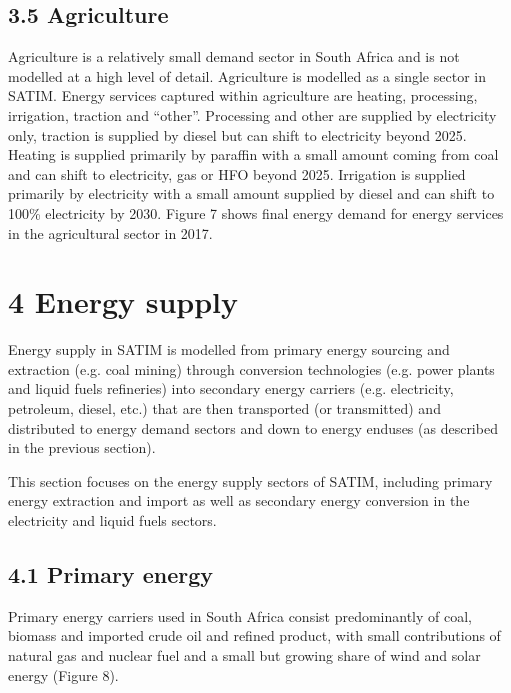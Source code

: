 \documentclass[letterpaper,10pt,english]{jupyterBook}
\begin{document}
\section{3.5 Agriculture}
\label{\detokenize{03Energydemand:agriculture}}
\sphinxAtStartPar
Agriculture is a relatively small demand sector in South Africa and is not modelled at a high level of detail. Agriculture is modelled as a single sector in SATIM. Energy services captured within agriculture are heating, processing, irrigation, traction and “other”. Processing and other are supplied by electricity only, traction is supplied by diesel but can shift to electricity beyond 2025. Heating is supplied primarily by paraffin with a small amount coming from coal and can shift to electricity, gas or HFO beyond 2025. Irrigation is supplied primarily by electricity with a small amount supplied by diesel and can shift to 100\% electricity by 2030. Figure 7 shows final energy demand for energy services in the agricultural sector in 2017.

\sphinxAtStartPar
{}

\sphinxstepscope


\chapter{4 Energy supply}
\label{\detokenize{04EnergySupply:energy-supply}}\label{\detokenize{04EnergySupply::doc}}
\sphinxAtStartPar
Energy supply in SATIM is modelled from primary energy sourcing and extraction (e.g. coal mining) through conversion technologies (e.g. power plants and liquid fuels refineries) into secondary energy carriers (e.g. electricity, petroleum, diesel, etc.) that are then transported (or transmitted) and distributed to energy demand sectors and down to energy end\sphinxhyphen{}uses (as described in the previous section).

\sphinxAtStartPar
This section focuses on the energy supply sectors of SATIM, including primary energy extraction and import as well as secondary energy conversion in the electricity and liquid fuels sectors.


\section{4.1 Primary energy}
\label{\detokenize{04EnergySupply:primary-energy}}
\sphinxAtStartPar
Primary energy carriers used in South Africa consist predominantly of coal, biomass and imported crude oil and refined product, with small contributions of natural gas and nuclear fuel and a small but growing share of wind and solar energy (Figure 8).
\end{document}
